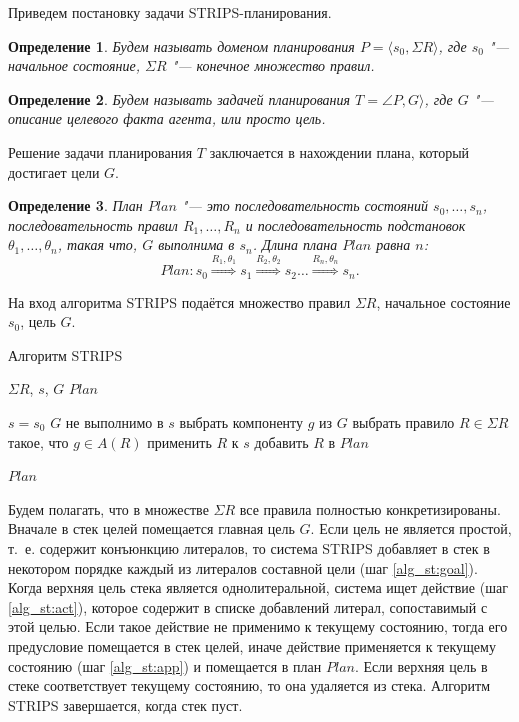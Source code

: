 \documentclass[b5paper,11pt]{book}
\newtheorem{Def}{Определение}
\numberwithin{Def}{section}
\numberwithin{Th}{chapter}
\numberwithin{St}{chapter}
\begin{document}
	Приведем постановку задачи STRIPS-планирования.
	
	\begin{Def}
		Будем называть доменом планирования $P = \langle s_0, \Sigma R\rangle$, где $s_0$ "--- начальное состояние, $\Sigma R$ "--- конечное множество правил.
	\end{Def}
	\begin{Def}
		Будем называть задачей планирования $T = \angle P, G\rangle$, где $G$ "--- описание целевого факта агента, или просто цель.
	\end{Def}

	Решение задачи планирования $T$ заключается в нахождении плана, который достигает цели $G$.
	\begin{Def}
		План $Plan$ "--- это последовательность состояний $s_0,\dots,s_n$, последовательность правил $R_1,\dots,R_n$ и последовательность подстановок $\theta_1,\dots,\theta_n$, такая что, $G$ выполнима в $s_n$. Длина плана $Plan$ равна $n$:
		\[
			Plan: s_0 \overset{R_1,\theta_1}{\Rightarrow} s_1 \overset{R_2,\theta_2}{\Rightarrow} s_2 \dots \overset{R_n,\theta_n}{\Rightarrow} s_n.
		\]
	\end{Def}
	
	На вход алгоритма STRIPS подаётся множество правил $\Sigma R$, начальное состояние $s_0$, цель $G$.
	
	\begin{algorithm}[H]
		\caption{Алгоритм STRIPS}\label{alg:strips}
		\begin{algorithmic}[1]
			\Require $\Sigma R$, $s$, $G$
			\Ensure $Plan$
			
			\State $s=s_0$
			\While $G$ не выполнимо в $s$
				\State выбрать компоненту $g$ из $G$ \label{alg_st:goal}
				\State выбрать правило $R\in\Sigma R$ такое, что $g\in A(R)$ \label{alg_st:act}
				\State {}
				\State применить $R$ к $s$ \label{alg_st:app}
				\State добавить $R$ в $Plan$
			\EndWhile
			
			\Return $Plan$
		\end{algorithmic}
	\end{algorithm}

	Будем полагать, что в множестве $\Sigma R$ все правила полностью конкретизированы. Вначале в стек целей помещается главная цель $G$. Если цель не является простой, т.~е. содержит конъюнкцию литералов, то система STRIPS добавляет в стек в некотором порядке каждый из литералов составной цели (шаг \autoref{alg_st:goal}). Когда верхняя цель стека является однолитеральной, система ищет действие (шаг \autoref{alg_st:act}), которое содержит в списке добавлений литерал, сопоставимый с этой целью. Если такое действие не применимо к текущему состоянию, тогда его предусловие помещается в стек целей, иначе действие применяется к текущему состоянию (шаг \autoref{alg_st:app}) и помещается в план $Plan$. Если верхняя цель в стеке соответствует текущему состоянию, то она удаляется из стека. Алгоритм STRIPS завершается, когда стек пуст.
	
\end{document}
